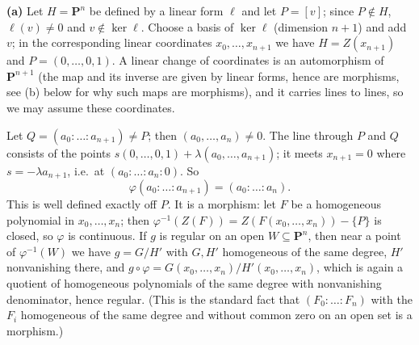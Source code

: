 \documentclass[11pt]{article}
\begin{document}
\pf
\textbf{(a)} Let $H=\mathbf P^n$ be defined by a linear form $\ell$ and let $P=[v]$; since $P\notin H$, $\ell(v)\ne0$ and $v\notin\ker\ell$. Choose a basis of $\ker \ell$ (dimension $n+1$) and add $v$; in the corresponding linear coordinates $x_0,\dots,x_{n+1}$ we have $H=Z(x_{n+1})$ and $P=(0,\dots,0,1)$. A linear change of coordinates is an automorphism of $\mathbf P^{n+1}$ (the map and its inverse are given by linear forms, hence are morphisms, see (b) below for why such maps are morphisms), and it carries lines to lines, so we may assume these coordinates.

Let $Q=(a_0:\dots:a_{n+1})\ne P$; then $(a_0,\dots,a_n)\ne 0$. The line through $P$ and $Q$ consists of the points $s(0,\dots,0,1)+\lambda(a_0,\dots,a_{n+1})$; it meets $x_{n+1}=0$ where $s=-\lambda a_{n+1}$, i.e.\ at $(a_0:\dots:a_n:0)$. So
\[
\varphi(a_0:\dots:a_{n+1})=(a_0:\dots:a_n).
\]
This is well defined exactly off $P$. It is a morphism: let $F$ be a homogeneous polynomial in $x_0,\dots,x_n$; then $\varphi^{-1}(Z(F))=Z(F(x_0,\dots,x_n))-\{P\}$ is closed, so $\varphi$ is continuous. If $g$ is regular on an open $W\subseteq\mathbf P^n$, then near a point of $\varphi^{-1}(W)$ we have $g=G/H'$ with $G,H'$ homogeneous of the same degree, $H'$ nonvanishing there, and $g\circ\varphi=G(x_0,\dots,x_n)/H'(x_0,\dots,x_n)$, which is again a quotient of homogeneous polynomials of the same degree with nonvanishing denominator, hence regular. (This is the standard fact that $(F_0:\dots:F_n)$ with the $F_i$ homogeneous of the same degree and without common zero on an open set is a morphism.)
\end{document}
